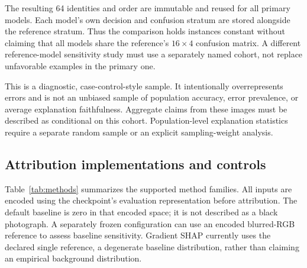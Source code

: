 \documentclass{article}
\begin{document}
The resulting 64 identities and order are immutable and reused for all primary models. Each model's own decision and confusion stratum are stored alongside the reference stratum. Thus the comparison holds instances constant without claiming that all models share the reference's $16\times4$ confusion matrix. A different reference-model sensitivity study must use a separately named cohort, not replace unfavorable examples in the primary one.

This is a diagnostic, case-control-style sample. It intentionally overrepresents errors and is not an unbiased sample of population accuracy, error prevalence, or average explanation faithfulness. Aggregate claims from these images must be described as conditional on this cohort. Population-level explanation statistics require a separate random sample or an explicit sampling-weight analysis.

\subsection{Attribution implementations and controls}
Table~\ref{tab:methods} summarizes the supported method families. All inputs are encoded using the checkpoint's evaluation representation before attribution. The default baseline is zero in that encoded space; it is not described as a black photograph. A separately frozen configuration can use an encoded blurred-RGB reference to assess baseline sensitivity. Gradient SHAP currently uses the declared single reference, a degenerate baseline distribution, rather than claiming an empirical background distribution.
\end{document}

